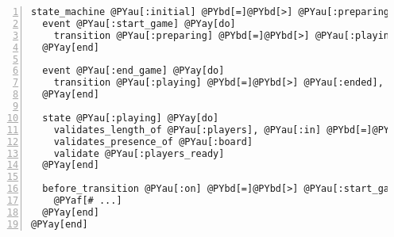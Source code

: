 \begin{Verbatim}[commandchars=@\[\],numbers=left,firstnumber=1,stepnumber=1]
state_machine @PYau[:initial] @PYbd[=]@PYbd[>] @PYau[:preparing] @PYay[do]
  event @PYau[:start_game] @PYay[do]
    transition @PYau[:preparing] @PYbd[=]@PYbd[>] @PYau[:playing]
  @PYay[end]

  event @PYau[:end_game] @PYay[do]
    transition @PYau[:playing] @PYbd[=]@PYbd[>] @PYau[:ended], @PYau[:if] @PYbd[=]@PYbd[>] @PYau[:winner?]
  @PYay[end]

  state @PYau[:playing] @PYay[do]
    validates_length_of @PYau[:players], @PYau[:in] @PYbd[=]@PYbd[>] @PYag[3]@PYbd[.].@PYag[4]
    validates_presence_of @PYau[:board]
    validate @PYau[:players_ready]
  @PYay[end]

  before_transition @PYau[:on] @PYbd[=]@PYbd[>] @PYau[:start_game] @PYay[do] @PYbd[|]game@PYbd[|]
    @PYaf[# ...]
  @PYay[end]
@PYay[end]
\end{Verbatim}
